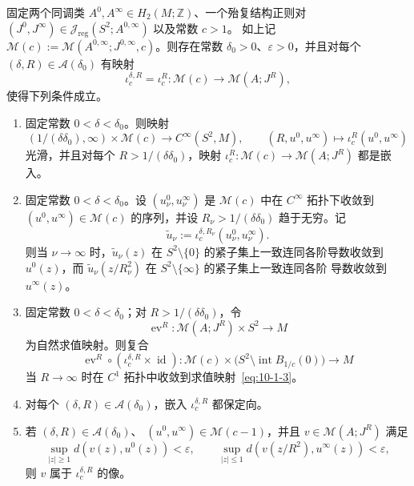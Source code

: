 \begin{theorem}[\BookRecordIndex{T0254}粘合]\label{thm:10-1-2}
固定两个同调类 $A^0,A^\infty\in H_2(M;\mathbb Z)$、一个殆复结构正则对
$(J^0,J^\infty)\in\mathcal J_{\mathrm{reg}}(S^2;A^{0,\infty})$ 以及常数 $c>1$。
如上记 $\mathcal M(c):=\mathcal M(A^{0,\infty};J^{0,\infty},c)$。则存在常数
$\delta_0>0$、$\varepsilon>0$，并且对每个
$(\delta,R)\in\mathcal A(\delta_0)$ 有映射
\[
  \iota_c^{\delta,R}=\iota_c^R:
  \mathcal M(c)\longrightarrow\mathcal M(A;J^R),
\]
使得下列条件成立。

\begin{enumerate}[label=\textnormal{(\roman*)}]
\item 固定常数 $0<\delta<\delta_0$。则映射
\[
  (1/(\delta\delta_0),\infty)\times\mathcal M(c)
  \longrightarrow C^\infty(S^2,M),
  \qquad (R,u^0,u^\infty)\longmapsto\iota_c^R(u^0,u^\infty)
\]
光滑，并且对每个 $R>1/(\delta\delta_0)$，映射
$\iota_c^R:\mathcal M(c)\to\mathcal M(A;J^R)$ 都是嵌入。

\item 固定常数 $0<\delta<\delta_0$。设
$(u_\nu^0,u_\nu^\infty)$ 是 $\mathcal M(c)$ 中在 $C^\infty$ 拓扑下收敛到
$(u^0,u^\infty)\in\mathcal M(c)$ 的序列，并设
$R_\nu>1/(\delta\delta_0)$ 趋于无穷。记
\[
  \widetilde u_\nu:=\iota_c^{\delta,R_\nu}(u_\nu^0,u_\nu^\infty).
\]
则当 $\nu\to\infty$ 时，$\widetilde u_\nu(z)$ 在
$S^2\setminus\{0\}$ 的紧子集上一致连同各阶导数收敛到 $u^0(z)$，而
$\widetilde u_\nu(z/R_\nu^2)$ 在 $S^2\setminus\{\infty\}$ 的紧子集上一致连同各阶
导数收敛到 $u^\infty(z)$。

\item 固定常数 $0<\delta<\delta_0$；对 $R>1/(\delta\delta_0)$，令
\[
  \operatorname{ev}^R:\mathcal M(A;J^R)\times S^2\longrightarrow M
\]
为自然求值映射。则复合
\[
  \operatorname{ev}^R\circ(\iota_c^{\delta,R}\times\operatorname{id}):
  \mathcal M(c)\times\bigl(S^2\setminus\operatorname{int}B_{1/c}(0)\bigr)
  \longrightarrow M
\]
当 $R\to\infty$ 时在 $C^1$ 拓扑中收敛到求值映射~\eqref{eq:10-1-3}。

\item 对每个 $(\delta,R)\in\mathcal A(\delta_0)$，嵌入
$\iota_c^{\delta,R}$ 都保定向。

\item 若 $(\delta,R)\in\mathcal A(\delta_0)$、
$(u^0,u^\infty)\in\mathcal M(c-1)$，并且
$v\in\mathcal M(A;J^R)$ 满足
\[
  \sup_{|z|\ge1}d(v(z),u^0(z))<\varepsilon,
  \qquad
  \sup_{|z|\le1}d(v(z/R^2),u^\infty(z))<\varepsilon,
\]
则 $v$ 属于 $\iota_c^{\delta,R}$ 的像。
\end{enumerate}
\end{theorem}

